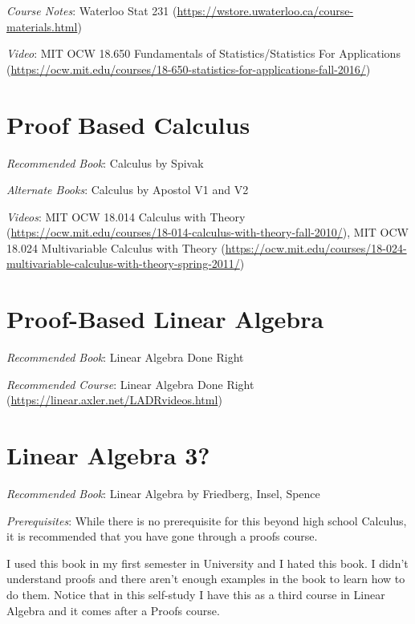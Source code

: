 \documentclass[openany,10pt]{book}
\begin{document}
\textit{Course Notes}: Waterloo Stat 231 (\url{https://wstore.uwaterloo.ca/course-materials.html})

\noindent \textit{Video}: MIT OCW 18.650 Fundamentals of Statistics/Statistics For Applications (\url{https://ocw.mit.edu/courses/18-650-statistics-for-applications-fall-2016/})

\chapter{Proof Based Calculus}

\textit{Recommended Book}: Calculus by Spivak\newline

\noindent \textit{Alternate Books}: Calculus by Apostol V1 and V2\newline

\noindent \textit{Videos}: MIT OCW 18.014 Calculus with Theory (\url{https://ocw.mit.edu/courses/18-014-calculus-with-theory-fall-2010/}), MIT OCW 18.024 Multivariable Calculus with Theory (\url{https://ocw.mit.edu/courses/18-024-multivariable-calculus-with-theory-spring-2011/})

\chapter{Proof-Based Linear Algebra}

\textit{Recommended Book}: Linear Algebra Done Right \newline

\noindent \textit{Recommended Course}: Linear Algebra Done Right (\url{https://linear.axler.net/LADRvideos.html}) \newline

\chapter{Linear Algebra 3?}

\textit{Recommended Book}: Linear Algebra by Friedberg, Insel, Spence\newline

\noindent \textit{Prerequisites}: While there is no prerequisite for this beyond high school Calculus, it is recommended that you have gone through a proofs course.\newline

\noindent I used this book in my first semester in University and I hated this book.  I didn't understand proofs and there aren't enough examples in the book to learn how to do them.  Notice that in this self-study I have this as a third course in Linear Algebra and it comes after a Proofs course. 
\end{document}

